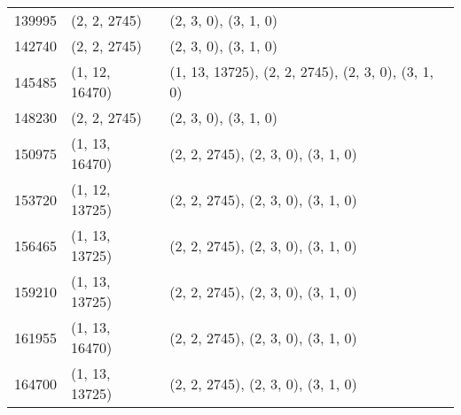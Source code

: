 \begin{center}
\begin{longtable}{|l|l|l|}
139995 & (2, 2, 2745) & (2, 3, 0), (3, 1, 0) \\
142740 & (2, 2, 2745) & (2, 3, 0), (3, 1, 0) \\
145485 & (1, 12, 16470) & (1, 13, 13725), (2, 2, 2745), (2, 3, 0), (3, 1, 0) \\
148230 & (2, 2, 2745) & (2, 3, 0), (3, 1, 0) \\
150975 & (1, 13, 16470) & (2, 2, 2745), (2, 3, 0), (3, 1, 0) \\
153720 & (1, 12, 13725) & (2, 2, 2745), (2, 3, 0), (3, 1, 0) \\
156465 & (1, 13, 13725) & (2, 2, 2745), (2, 3, 0), (3, 1, 0) \\
159210 & (1, 13, 13725) & (2, 2, 2745), (2, 3, 0), (3, 1, 0) \\
161955 & (1, 13, 16470) & (2, 2, 2745), (2, 3, 0), (3, 1, 0) \\
164700 & (1, 13, 13725) & (2, 2, 2745), (2, 3, 0), (3, 1, 0) \\
\end{longtable}
\end{center}

